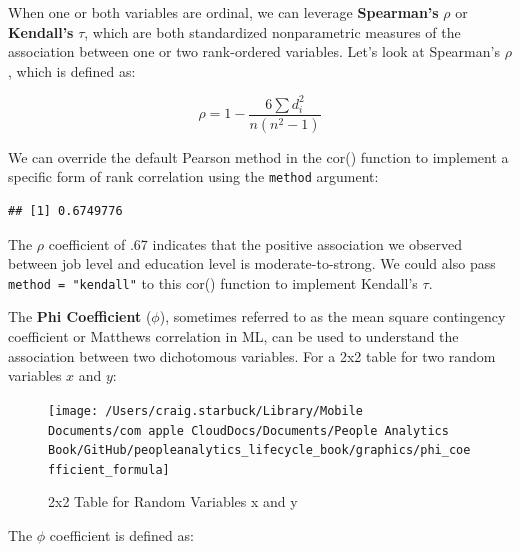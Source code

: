 \documentclass[]{book}
\newenvironment{Shaded}{\begin{snugshade}}{\end{snugshade}}
\newcommand{\CommentTok}[1]{\textcolor[rgb]{0.56,0.35,0.01}{\textit{#1}}}
\newcommand{\DataTypeTok}[1]{\textcolor[rgb]{0.13,0.29,0.53}{#1}}
\newcommand{\KeywordTok}[1]{\textcolor[rgb]{0.13,0.29,0.53}{\textbf{#1}}}
\newcommand{\NormalTok}[1]{#1}
\newcommand{\OperatorTok}[1]{\textcolor[rgb]{0.81,0.36,0.00}{\textbf{#1}}}
\newcommand{\StringTok}[1]{\textcolor[rgb]{0.31,0.60,0.02}{#1}}
\begin{document}
When one or both variables are ordinal, we can leverage \textbf{Spearman's} \(\rho\) or \textbf{Kendall's} \(\tau\), which are both standardized nonparametric measures of the association between one or two rank-ordered variables. Let's look at Spearman's \(\rho\), which is defined as:

\[ \rho = 1 - {\frac {6 \sum d_i^2}{n(n^2 - 1)}} \]

We can override the default Pearson method in the cor() function to implement a specific form of rank correlation using the \texttt{method} argument:

\begin{Shaded}
\end{Shaded}

\begin{verbatim}
## [1] 0.6749776
\end{verbatim}

The \(\rho\) coefficient of .67 indicates that the positive association we observed between job level and education level is moderate-to-strong. We could also pass \texttt{method\ =\ "kendall"} to this cor() function to implement Kendall's \(\tau\).

The \textbf{Phi Coefficient} (\(\phi\)), sometimes referred to as the mean square contingency coefficient or Matthews correlation in ML, can be used to understand the association between two dichotomous variables. For a 2x2 table for two random variables \(x\) and \(y\):

\begin{figure}

{\centering \texttt{[image: /Users/craig.starbuck/Library/Mobile Documents/com~apple~CloudDocs/Documents/People Analytics Book/GitHub/peopleanalytics\_lifecycle\_book/graphics/phi\_coefficient\_formula]} 

}

\caption{2x2 Table for Random Variables x and y}\label{fig:phi-tbl}
\end{figure}

The \(\phi\) coefficient is defined as:
\end{document}
